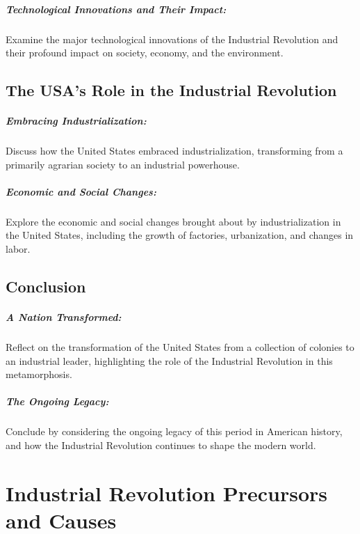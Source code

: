 \documentclass[a4paper,12pt]{book}
\begin{document}
\paragraph{Technological Innovations and Their Impact:}
Examine the major technological innovations of the Industrial Revolution and their profound impact on society, economy, and the environment.

\section*{The USA’s Role in the Industrial Revolution}

\paragraph{Embracing Industrialization:}
Discuss how the United States embraced industrialization, transforming from a primarily agrarian society to an industrial powerhouse.

\paragraph{Economic and Social Changes:}
Explore the economic and social changes brought about by industrialization in the United States, including the growth of factories, urbanization, and changes in labor.

\section*{Conclusion}

\paragraph{A Nation Transformed:}
Reflect on the transformation of the United States from a collection of colonies to an industrial leader, highlighting the role of the Industrial Revolution in this metamorphosis.

\paragraph{The Ongoing Legacy:}
Conclude by considering the ongoing legacy of this period in American history, and how the Industrial Revolution continues to shape the modern world.

\chapter{Industrial Revolution Precursors and Causes}
\end{document}
